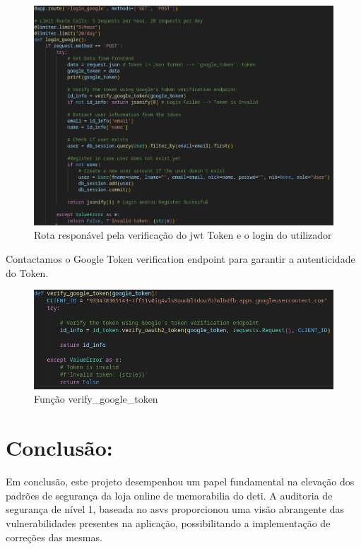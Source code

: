    \begin{figure}[H]
      \centering
      \includegraphics[width=16cm]{images/MFA_login_google.png}
      \caption{Rota responável pela verificação do \ac{jwt} Token e o login do utilizador}
      \label{fig:login_google}
    \end{figure}

Contactamos o Google Token verification endpoint para garantir a autenticidade do Token.

   \begin{figure}[H]
      \centering
      \includegraphics[width=16cm]{images/verify_token.png}
      \caption{Função verify\_google\_token}
      \label{fig:verify_google_token}
    \end{figure}


%
\chapter*{Conclusão:}
\label{chap.conclusão}

Em conclusão, este projeto desempenhou um papel fundamental na elevação dos padrões de segurança da loja online de memorabilia do \ac{deti}. A auditoria de segurança de nível 1, baseada no \ac{asvs} proporcionou uma visão abrangente das vulnerabilidades presentes na aplicação, possibilitando a implementação de correções das mesmas.

